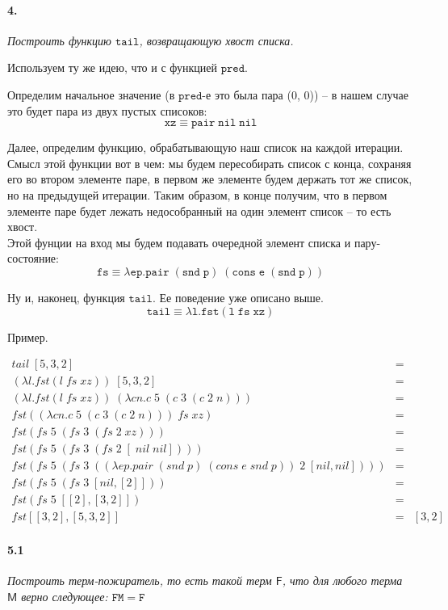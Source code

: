 \documentclass[russian]{article}
\begin{document}
\paragraph*{4.} \textit{Построить функцию $\mathtt{tail}$, возвращающую хвост списка.}

Используем ту же идею, что и с функцией $\mathtt{pred}$.

Определим начальное значение (в $\mathtt{pred}$-е это была пара (0, 0)) -- в нашем случае это будет пара из двух пустых списоков:
\[
\mathtt{xz \equiv pair\; nil\; nil}
\]

Далее, определим функцию, обрабатывающую наш список на каждой итерации. Смысл этой функции вот в чем: мы будем пересобирать список с конца, сохраняя его во втором элементе паре, в первом же элементе будем держать тот же список, но на предыдущей итерации. Таким образом, в конце получим, что в первом элементе паре будет лежать недособранный на один элемент список -- то есть хвост.\\
Этой фунции на вход мы будем подавать очередной элемент списка и пару-состояние: 
\[
\mathtt{fs \equiv \lambda ep.pair\; (snd\; p)\; (cons\; e\; (snd\; p))}
\]

Ну и, наконец, функция $\mathtt{tail}$. Ее поведение уже описано выше.
\[
\mathtt{tail \equiv \lambda l.fst (l\; fs\; xz)}
\]

Пример.

\begin{eqnarray*}
tail\; [5, 3, 2] & =\\
(\lambda l.fst (l\; fs\; xz))\; [5, 3, 2] &=\\
(\lambda l.fst (l\; fs\; xz))\; (\lambda cn.c\;5\;(c\;3\;(c\;2\;n))) &=\\
fst ((\lambda cn.c\;5\;(c\;3\;(c\;2\;n)))\; fs\; xz) &=\\
fst (fs\;5\;(fs\;3\;(fs\;2\;xz))) &=\\
fst (fs\;5\;(fs\;3\;(fs\;2\;[\;nil\;nil]))) &=\\
fst (fs\;5\;(fs\;3\;((\lambda ep.pair\; (snd\; p)\; (cons\; e\; snd\; p))\;2\;[nil, nil]))) &=\\
fst (fs\;5\;(fs\;3\;[nil, [2]])) &=\\
fst (fs\;5\;[[2], [3, 2]]) &=\\
fst [[3, 2], [5, 3, 2]] & = & [3, 2]
\end{eqnarray*}


\paragraph*{5.1} \textit{Построить терм-пожиратель, то есть такой терм $\mathsf{F}$, что для любого терма $\mathsf{M}$ верно следующее: $\mathtt{FM = F}$}
\end{document}
